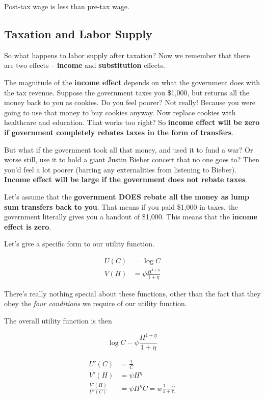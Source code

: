 \documentclass[11pt]{scrartcl}
\begin{document}
Post-tax wage is less than pre-tax wage.

\subsection{Taxation and Labor Supply}
So what happens to labor supply after taxation? Now we remember that there are two effects -- \textbf{income} and \textbf{substitution} effects. 

The magnitude of the \textbf{income effect} depends on what the government does with the tax revenue. Suppose the government taxes you \$1,000, but returns all the money back to you as cookies. Do you feel poorer? Not really! Because you were going to use that money to buy cookies anyway. Now replace cookies with healthcare and education. That works too right? So \textbf{income effect will be zero if government completely rebates taxes in the form of transfers}.

But what if the government took all that money, and used it to fund a war? Or worse still, use it to hold a giant Justin Bieber concert that no one goes to? Then you'd feel a lot poorer (barring any externalities from listening to Bieber). \textbf{Income effect will be large if the government does not rebate taxes}.

Let's assume that the \textbf{government DOES rebate all the money as lump sum transfers back to you}. That means if you paid \$1,000 in taxes, the government literally gives you a handout of \$1,000. This means that the \textbf{income effect is zero}.

Let's give a specific form to our utility function.

\begin{align*}
U(C) &= \log{C} \\
V(H) &= \psi \frac{H^{1+\eta}}{1+\eta}
\end{align*}

There's really nothing special about these functions, other than the fact that they obey the \emph{four conditions} we require of our utility function.

The overall utility function is then

\[\log{C} - \psi \frac{H^{1+\eta}}{1+\eta}\]

\begin{align*}
U'(C) &= \frac{1}{C} \\
V'(H) &= \psi H^\eta \\
\frac{V'(H)}{U'(C)} &= \psi H^\eta C = w \frac{1-\tau_l}{1+\tau_c}
\end{align*}
\end{document}
